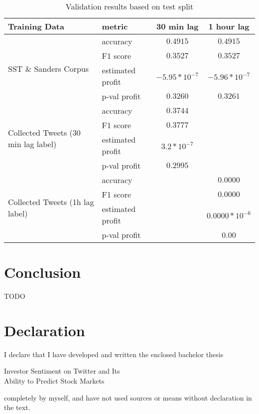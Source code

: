 \documentclass[a4paper,12pt]{article}%
\begin{document}
\begin{table}
\centering
\captionsetup{justification=centering}
\begin{tabular}{ |l|l|c|c| }
\hline
Training Data & metric & 30 min lag & 1 hour lag \\ \hline
\multirow{4}{*}{SST \& Sanders Corpus} & accuracy & $0.4915$ & $0.4915$ \\
 & F1 score & $0.3527$ & $0.3527$ \\
 & estimated profit & $-5.95 * 10^{-7}$ & $-5.96* 10^{-7}$ \\
 & p-val profit & $0.3260$ & $0.3261$ \\ \hline
\multirow{4}{*}{Collected Tweets (30 min lag label)} & accuracy & $0.3744$ & \\
 & F1 score & $0.3777$ &  \\
 & estimated profit & $3.2 * 10^{-7}$ & \\
 & p-val profit & $0.2995$ &  \\ \hline
\multirow{4}{*}{Collected Tweets (1h lag label)} & accuracy & & $0.0000$  \\
 & F1 score & & $0.0000$ \\
 & estimated profit & & $0.0000* 10^{-6}$ \\
 & p-val profit & & 0.00 \\ \hline
\end{tabular}
\caption{Validation results based on test split\label{table:tree_lstm_test}}
\end{table}



 

\section{Conclusion}
TODO

\newpage
\section*{Declaration}

\vspace{2cm}
\begin{flushleft}
    I declare that I have developed and written the enclosed
    bachelor thesis\\[-0.3cm]
\end{flushleft}
\begin{center}
    {\large Investor Sentiment on Twitter and Its \\Ability to Predict Stock Markets}\\[0.5cm]
\end{center}
    completely by myself, and have not used sources or means without
    declaration in the text.\\[2.5cm]
\end{document}
